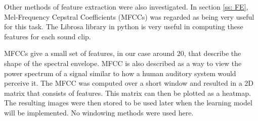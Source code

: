 Other methods of feature extraction were also investigated. In section \ref{ss: FE}, Mel-Frequency Cepstral Coefficients (MFCCs) was regarded as being very useful for this task. The Librosa library in python is very useful in computing these features for each sound clip.  

MFCCs give a small set of features, in our case around 20, that describe the shape of the spectral envelope. MFCC is also described as a way to view the power spectrum of a signal similar to how a human auditory system would perceive it. The MFCC was computed over a short window and resulted in a 2D matrix that consists of features. This matrix can then be plotted as a heatmap. The resulting images were then stored to be used later when the learning model will be implemented. No windowing methods were used here. 


% 
% 
